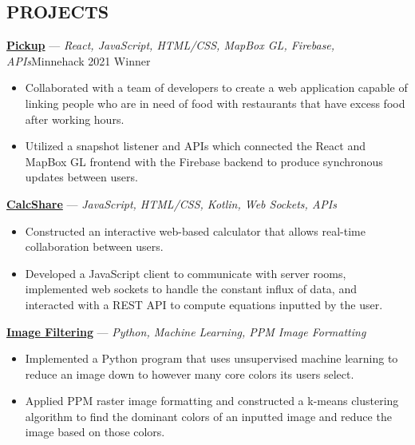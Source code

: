 \documentclass[11pt]{res}
\begin{document}
\begin{footnotesize}
\begin{resume}
\begin{small}
\section{PROJECTS}
\end{small} 
\vspace{.5mm}
\href{https://devpost.com/software/pickup-7b8yhx}{\textbf{Pickup}} — {\sl React, JavaScript, HTML/CSS, MapBox GL, Firebase, APIs}\hfill Minnehack 2021 Winner\vspace{-5mm}
\begin{itemize}[leftmargin=6.25mm] \itemsep -2pt 
\item Collaborated with a team of developers to create a web application capable of linking people who are in need of food with restaurants that have excess food after working hours.
\vspace{1mm}
\item Utilized a snapshot listener and APIs which connected the React and MapBox GL frontend with the Firebase backend to produce synchronous updates between users. 
\end{itemize}
\vspace{-2.5mm}
\href{https://github.com/CharlesShi12/CalcShare}{\textbf{CalcShare}} — {\sl JavaScript, HTML/CSS, Kotlin, Web Sockets, APIs} \vspace{-5mm}
\begin{itemize}[leftmargin=6.25mm] \itemsep -2pt 
\item Constructed an interactive web-based calculator that allows real-time collaboration between users. 
\vspace{1mm}
\item Developed a JavaScript client to communicate with server rooms, implemented web sockets to handle the constant influx of data, and interacted with a REST API to compute equations inputted by the user. 
\end{itemize}
\vspace{-2.5mm}
\href{https://github.com/CharlesShi12/ImageFilters}{\textbf{Image Filtering}} — {\sl Python, Machine Learning, PPM Image Formatting} \vspace{-5mm}
\begin{itemize}[leftmargin=6.25mm] \itemsep -2pt 
\item Implemented a Python program that uses unsupervised machine learning to reduce an image down to however many core colors its users select.
\vspace{1mm}
\item Applied PPM raster image formatting and constructed a k-means clustering algorithm to find the dominant colors of an inputted image and reduce the image based on those colors. 
\end{itemize}
\begin{small}

\end{small}
\end{resume}
\end{footnotesize}
\end{document}
